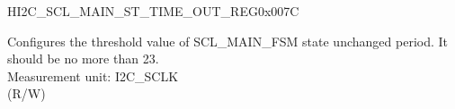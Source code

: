 \begin{register}{H}{I2C\_SCL\_MAIN\_ST\_TIME\_OUT\_REG}{0x007C}\label{regdesc:I2CSCLMAINSTTIMEOUTREG}
%
%
\regnewline%
\begin{regdesc}\begin{reglist}
\label{fielddesc:I2CSCLMAINSTTOI2C}\item [I2C\_SCL\_MAIN\_ST\_TO\_I2C] Configures the threshold value of SCL\_MAIN\_FSM state unchanged period. It should be no more than 23.\\
Measurement unit: I2C\_SCLK \\ (R/W)
\end{reglist}\end{regdesc}
\end{register}


